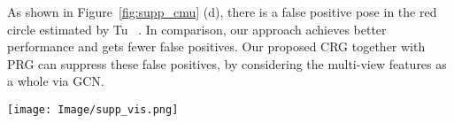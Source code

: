 \documentclass[10pt,twocolumn,letterpaper]{article}
\begin{document}
As shown in Figure~\ref{fig:supp_cmu} (d), there is a false positive pose in the red circle estimated by Tu \etal~\cite{tu2020voxelpose}. In comparison, our approach achieves better performance and gets fewer false positives. Our proposed CRG together with PRG can suppress these false positives, by considering the multi-view features as a whole via GCN. 

\begin{figure*}[ht]
	\centering
	\texttt{[image: Image/supp\_vis.png]}
	\caption{\textbf{Qualitative analysis on CMU Panoptic dataset (a, b, c) and Shelf dataset (d).} Estimated 3D poses and their 2D projections of ours, and Tu \etal~\cite{tu2020voxelpose}. The ground-truth 3D poses are in black, while the predicted 3D poses are in other colors (red, blue \etc). Inaccurate poses, false negatives, and false positives are highlighted with circles. Best viewed in color.}
	\label{fig:supp_cmu}
\end{figure*}
\end{document}
